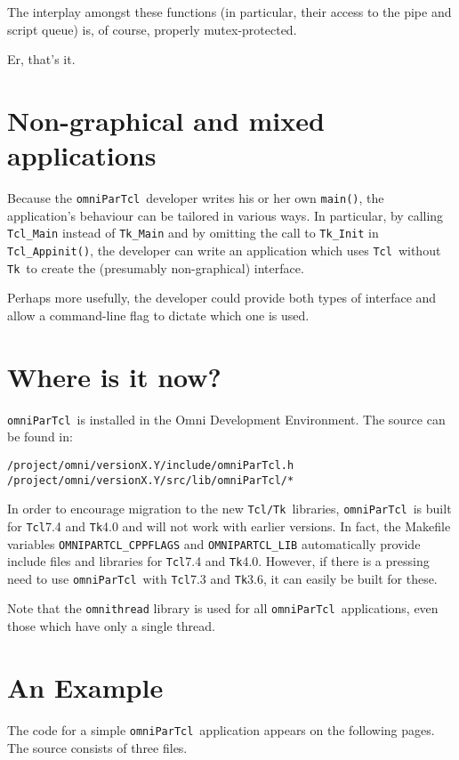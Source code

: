 \documentclass[11pt,twoside,onecolumn]{article}
\def\omniParTcl{{\tt omniParTcl}}
\def\tcltk{{\tt Tcl/Tk}}
\def\tcl{{\tt Tcl}}
\def\tk{{\tt Tk}}
\begin{document}
\noindent
The interplay amongst these functions (in particular, their access
to the pipe and script queue) is, of course, properly mutex-protected.

Er, that's it.

\section{Non-graphical and mixed applications}

Because the \omniParTcl\ developer writes his or her own {\tt main()},
the application's behaviour can be tailored in various ways.  In
particular, by calling {\tt Tcl\_Main} instead of {\tt Tk\_Main}
and by omitting the call to {\tt Tk\_Init} in 
{\tt Tcl\_Appinit()}, the developer can write an application which
uses \tcl\ without \tk\ to create the (presumably non-graphical) interface.

Perhaps more usefully, the developer could provide both types of interface
and allow a command-line flag to dictate which one is used.  

\section{Where is it now?}

\omniParTcl\ is installed in the Omni Development Environment.
The source can be found in:

\begin{verbatim}
/project/omni/versionX.Y/include/omniParTcl.h
/project/omni/versionX.Y/src/lib/omniParTcl/*
\end{verbatim}

In order to encourage migration to the new \tcltk\ libraries,
\omniParTcl\ is built for \tcl 7.4 and \tk 4.0 and will not
work with earlier versions.  In fact, the Makefile variables 
\verb|OMNIPARTCL_CPPFLAGS| and \verb|OMNIPARTCL_LIB| automatically provide
include files and libraries for \tcl 7.4 and \tk 4.0.  However, if there is a
pressing need to use \omniParTcl\ with \tcl 7.3 and \tk 3.6, it can
easily be built for these.

Note that the {\tt omnithread} library is used for all \omniParTcl\ 
applications, even those which have only a single thread.

\section{An Example}

The code for a simple \omniParTcl\ application appears on the following
pages.  The source consists of three files.
\end{document}
